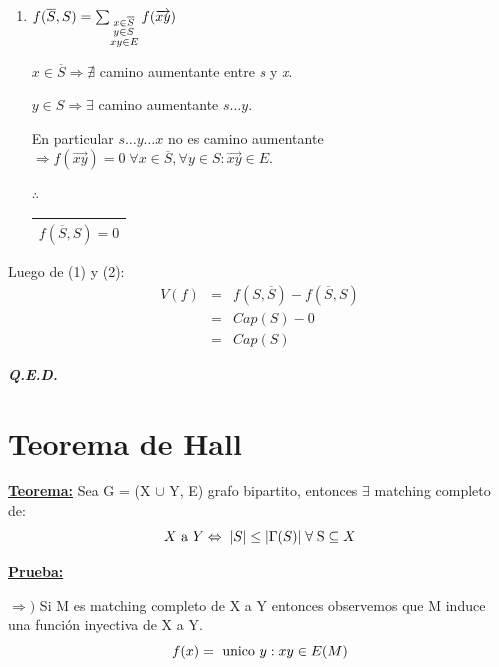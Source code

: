 \documentclass[12pt,a4paper]{report}
\newcommand{\QED}{\hfill \textit{\textbf{Q.E.D.}}}
\begin{document}
\begin{enumerate}[(1)]
  						\item $f(\overline{S}, S) = \sum_{\begin{subarray}{l} \; x \in \overline{S} \\
  							\; y \in S \\ xy \in E\end{subarray}} f(\overrightarrow{xy}) $
  							\par $x \in \overline{S} \Rightarrow \nexists$ camino aumentante entre \textit{s} y \textit{x}.
  							\par $y \in S \Rightarrow \exists$ camino aumentante $ s \dotsc y$.
  							\par En particular $s \dotsc y \dotsc x$ no es camino aumentante $\Rightarrow f(\overrightarrow{xy}) = 0  \; \forall x \in \overline{S}, \forall y \in S : \overrightarrow{xy} \in E$.

  							\begin{center}
  								\par $\therefore$ \begin{tabular}{|c|} \hline $ f(\overline{S}, S) = 0 $ \\\hline \end{tabular}
  							\end{center}

  					\end{enumerate}

  					\par Luego de (1) y (2):
  					\begin{eqnarray}
  						\nonumber V(f) &=& f(S, \overline{S}) - f(\overline{S}, S)\\
  						\nonumber &=& Cap(S) - 0 \\
  						\nonumber &=& Cap(S)
  					\end{eqnarray}

  		\QED

  	\section{Teorema de Hall}
  		\textbf{\underline{Teorema:}} Sea G = (X $\cup$ Y, E) grafo bipartito, entonces $\exists$ matching completo de:
  		\[
  			X \textup{ a } Y \Leftrightarrow \; \lvert S \rvert \leq \lvert \Gamma(S) \rvert \; \forall \; \textup{S} \subseteq X
  		\]

  		\vspace{3mm}
  		\textbf{\underline{Prueba:}}
  			\par $\Rightarrow)$ Si M es matching completo de X a Y entonces observemos que M induce una función inyectiva de X a Y.
  			\[ f(x) = \textup{ unico } y : xy \in E(M) \]
\end{document}
